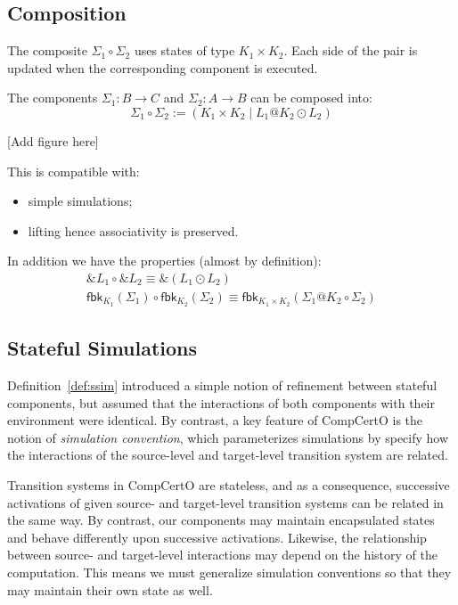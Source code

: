 \documentclass[acmsmall,screen,review,anonymous]{acmart}
\newcommand{\kw}[1]{\ensuremath{ \mathsf{#1} }}
\begin{document}

\subsection{Composition} %

The composite $\Sigma_1 \circ \Sigma_2$
uses states of type $K_1 \times K_2$.
Each side of the pair is updated
when the corresponding component is executed.

\begin{definition}[Composition]
The components
$\Sigma_1 : B \rightarrow C$ and
$\Sigma_2 : A \rightarrow B$
can be composed into:
\[
  \Sigma_1 \circ \Sigma_2 :=
    ( K_1 \times K_2 \mid L_1@K_2 \odot L_2 )
\]
\end{definition}

[Add figure here]

\begin{lemma}
  This is compatible with:
  \begin{itemize}
    \item simple simulations;
    \item lifting hence associativity is preserved.
  \end{itemize}
  In addition we have the properties (almost by definition):
  \begin{gather*}
    \&L_1 \circ \&L_2 \equiv \&(L_1 \odot L_2) \\
    \kw{fbk}_{K_1}(\Sigma_1) \circ \kw{fbk}_{K_2}(\Sigma_2) \equiv
    \kw{fbk}_{K_1 \times K_2}(\Sigma_1@K_2 \circ \Sigma_2)
  \end{gather*}
\end{lemma}


\subsection{Stateful Simulations} %

Definition~\ref{def:ssim} introduced a simple notion of refinement
between stateful components,
but assumed that the interactions of both components
with their environment were identical.
By contrast, a key feature of CompCertO
is the notion of \emph{simulation convention},
which parameterizes simulations by
specify how the interactions of
the source-level and target-level transition system
are related.

Transition systems in CompCertO are stateless,
and as a consequence,
successive activations of given
source- and target-level
transition systems can be related in the same way.
By contrast,
our components may maintain encapsulated states
and behave differently upon successive activations.
Likewise,
the relationship between source- and target-level interactions
may depend on the history of the computation.
This means we must generalize simulation conventions
so that they may maintain their own state as well.
\end{document}
